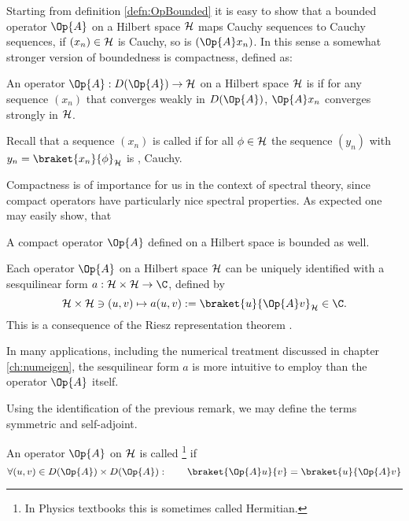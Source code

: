 Starting from definition \ref{defn:OpBounded}
it is easy to show that a bounded operator $\Op{A}$ on a Hilbert
space $\mathcal{H}$ maps Cauchy sequences to Cauchy sequences,
\ie if $(x_n) \in \mathcal{H}$ is Cauchy, so is $(\Op{A} x_n)$.
In this sense a somewhat stronger version of boundedness
is compactness, defined as:
\begin{defn}
	An operator $\Op{A} : D(\Op{A}) \to \hilbert$ on a Hilbert space $\mathcal{H}$
	is 
	if for any sequence $(x_n)$ that converges weakly in $D(\Op{A})$,
	$\Op{A} x_n$ converges strongly in $\mathcal{H}$.

	Recall that a sequence $(x_n)$ is called 
	if for all $\phi \in \mathcal{H}$ the sequence $(y_n)$ with
	$y_n = \braket{x_n}{\phi}_\hilbert$
	is , \ie Cauchy.
\end{defn}
Compactness is of importance for us in the context of spectral theory,
since compact operators have particularly nice spectral properties.
As expected one may easily show, that~
\begin{prop}
	A compact operator $\Op{A}$ defined on a Hilbert space is bounded as well.
\end{prop}

\begin{rem}
\label{rem:OpRietz}
Each operator $\Op{A}$ on a Hilbert space $\mathcal{H}$ can be
uniquely identified with a sesquilinear form
$a : \hilbert \times \hilbert \to \C$, defined by
\begin{equation}
	\hilbert \times \hilbert \ni (u, v) \mapsto a(u, v) := \braket{u}{\Op{A} v}_\hilbert \in \C.
	\label{eqn:formA}
\end{equation}
This is a consequence of the Riesz representation theorem \cite{DiracNotation}.

In many applications, including the numerical treatment discussed in chapter
\vref{ch:numeigen},
the sesquilinear form $a$ is more intuitive to employ than the operator $\Op{A}$ itself.
\end{rem}

Using the identification of the previous remark,
we may define the terms symmetric and self-adjoint.
\begin{defn}
	\label{def:SymmetricOperator}
	An operator $\Op{A}$ on $\mathcal{H}$ is called %
	\footnote{In Physics textbooks this is sometimes called Hermitian.}
	if
	\[ \forall (u, v) \in D(\Op{A}) \times D(\Op{A}): \qquad \braket{\Op{A} u}{v} = \braket{u}{\Op{A} v} \]
\end{defn}

